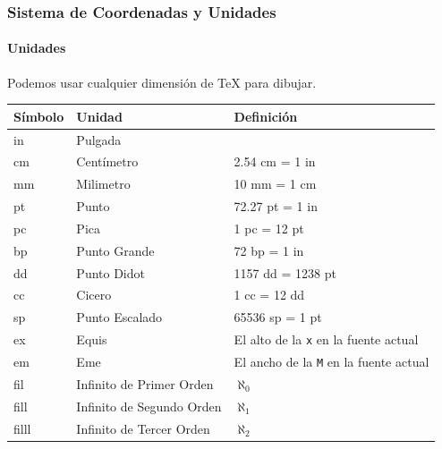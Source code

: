 \documentclass[12pt,aspectratio=169,ignorenonframetext]{ltxbeamer}
\begin{document}
\begin{frame}[fragile]
\frametitle{Sistema de Coordenadas y Unidades}
\framesubtitle{Unidades}

Podemos usar cualquier dimensión de {\lmr\TeX} para dibujar.

\begin{center}
\scriptsize
\begin{tabular}{>{\ttfamily}lll}
    \toprule
    Símbolo & Unidad & Definición \\
    \midrule
    in & Pulgada & \\
    cm & Centímetro & 2.54 cm = 1 in \\
    mm & Milimetro & 10 mm = 1 cm \\
    pt & Punto & 72.27 pt = 1 in \\
    pc & Pica & 1 pc = 12 pt \\
    bp & Punto Grande & 72 bp = 1 in \\
    dd & Punto Didot & 1157 dd = 1238 pt \\
    cc & Cicero & 1 cc = 12 dd \\
    sp & Punto Escalado & 65536 sp = 1 pt \\
    ex & Equis & El alto de la \texttt{x} en la fuente actual \\
    em & Eme & El ancho de la \texttt{M} en la fuente actual \\
    fil & Infinito de Primer Orden & \(\aleph_0\) \\
    fill & Infinito de Segundo Orden & \(\aleph_1\) \\
    filll & Infinito de Tercer Orden & \(\aleph_2\) \\
    \bottomrule
\end{tabular}
\end{center}
\end{frame}
\end{document}

